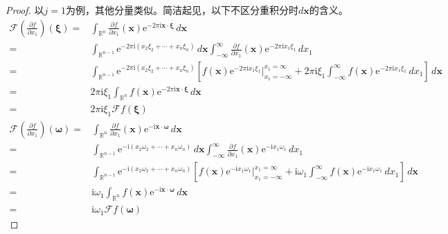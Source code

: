 \documentclass{ctexbook}
\begin{document}
\begin{proof}
    以$j=1$为例，其他分量类似。简洁起见，以下不区分重积分时$d\mathbf{x}$的含义。
    {\color{blue}\begin{align*}
    \mathcal{F} \left(\frac{\partial f}{\partial x_1}\right)(\boldsymbol{\xi})=&\int_{\mathbb{R}^n}\frac{\partial f}{\partial x_1}(\mathbf{x})\mathrm{e}^{-2\pi \mathrm{i} \mathbf{x}\cdot\boldsymbol{\xi}}\,d\mathbf{x}\\
    =&\int_{\mathbb{R}^{n-1}}\mathrm{e}^{-2\pi \mathrm{i} (x_2\xi_2+\cdots +x_n\xi_n)}\,d\mathbf{x}\int_{-\infty}^{\infty}\frac{\partial f}{\partial x_1}(\mathbf{x})\mathrm{e}^{-2\pi \mathrm{i} x_1 \xi_1}\,dx_1\\
    =&\int_{\mathbb{R}^{n-1}}\mathrm{e}^{-2\pi \mathrm{i} (x_2\xi_2+\cdots +x_n\xi_n)}\left[f(\mathbf{x})\mathrm{e}^{-2\pi \mathrm{i} x_1 \xi_1}\Big|_{x_1=-\infty}^{x_1=\infty}+2\pi \mathrm{i} \xi_1 \int_{-\infty}^{\infty}f(\mathbf{x})\mathrm{e}^{-2\pi \mathrm{i} x_1 \xi_1}\,dx_1\right]\,d\mathbf{x}\\
    =&2\pi \mathrm{i} \xi_1 \int_{\mathbb{R}^n}f(\mathbf{x})\mathrm{e}^{-2\pi \mathrm{i} \mathbf{x}\cdot\boldsymbol{\xi}}\,d\mathbf{x}\\
    =&2\pi \mathrm{i} \xi_1 \mathcal{F} f(\boldsymbol{\xi})
    \end{align*}}
    {\color{red}
    \begin{align*}
    \mathcal{F} \left(\frac{\partial f}{\partial x_1}\right)(\boldsymbol{\omega})=&\int_{\mathbb{R}^n}\frac{\partial f}{\partial x_1}(\mathbf{x})\mathrm{e}^{-\mathrm{i} \mathbf{x}\cdot\boldsymbol{\omega}}\,d\mathbf{x}\\
    =&\int_{\mathbb{R}^{n-1}}\mathrm{e}^{-\mathrm{i} (x_2\omega_2+\cdots +x_n\omega_n)}\,d\mathbf{x}\int_{-\infty}^{\infty}\frac{\partial f}{\partial x_1}(\mathbf{x})\mathrm{e}^{-\mathrm{i} x_1 \omega_1}\,dx_1\\
    =&\int_{\mathbb{R}^{n-1}}\mathrm{e}^{-\mathrm{i} (x_2\omega_2+\cdots +x_n\omega_n)}\left[f(\mathbf{x})\mathrm{e}^{-\mathrm{i} x_1 \omega_1}\Big|_{x_1=-\infty}^{x_1=\infty}+\mathrm{i} \omega_1 \int_{-\infty}^{\infty}f(\mathbf{x})\mathrm{e}^{-\mathrm{i} x_1 \omega_1}\,dx_1\right]\,d\mathbf{x}\\
    =&\mathrm{i} \omega_1 \int_{\mathbb{R}^n}f(\mathbf{x})\mathrm{e}^{-\mathrm{i} \mathbf{x}\cdot\boldsymbol{\omega}}\,d\mathbf{x}\\
    =&\mathrm{i} \omega_1 \mathcal{F} f(\boldsymbol{\omega})
    \end{align*}}
\end{proof}
\end{document}
